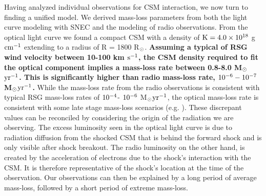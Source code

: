 \documentclass[a4paper,fleqn,usenatbib]{mnras}
\newcommand{\msunperiod}{M$\rm{_{\odot}}$}
\newcommand{\rsun}{R$\rm{_{\odot}}$}
\begin{document}
Having analyzed individual observations for CSM interaction, we now turn to finding a unified model.
We derived mass-loss parameters from both the light curve modeling with SNEC and the modeling of radio observations.
From the optical light curve we found a compact CSM with a density of $\rm{K = 4.0\times10^{18}}$ g $\rm{cm^{-1}}$ extending to a radius of R = 1800 \rsun. 
\textbf{Assuming a typical of RSG wind velocity between 10-100 km $\rm{s^{-1}}$, the CSM density required to fit the optical component implies a mass-loss rate between 0.8-8.0 \msunperiod $\rm{yr^{-1}}$.
This is significantly higher than radio mass-loss rate, $\rm{10^{-6}-10^{-7}}$ \msunperiod $\rm{yr^{-1}}$.}
While the mass-loss rate from the radio observations is consistent with typical RSG mass-loss rates of $\rm{10^{-4} }$- $\rm{10^{-6}}$ \msunperiod $\rm{yr^{-1}}$, the optical mass-loss rate is consistent with some late stage mass-loss scenarios (e.g. \citealt{2001chugai,2012quatert,2014shiode,2017fuller, 2017yaron}).
These discrepant values can be reconciled by considering the origin of the radiation we are observing.
The excess luminosity seen in the optical light curve is due to radiation diffusion from the shocked CSM that is behind the forward shock and is only visible after shock breakout.
The radio luminosity on the other hand, is created by the acceleration of electrons due to the shock's interaction with the CSM.
It is therefore representative of the shock's location at the time of the observation.
Our observations can then be explained by a long period of average mass-loss, followed by a short period of extreme mass-loss.
\end{document}
